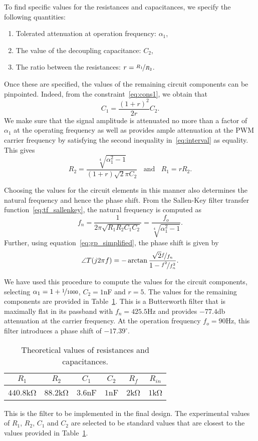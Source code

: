 To find specific values for the resistances and capacitances, we specify the
following quantities:
%
\begin{enumerate}
    \item Tolerated attenuation at operation frequency: $\alpha_1$,
    \item The value of the decoupling capacitance: $C_2$,
    \item The ratio between the resistances: $r = \nicefrac{R_1}{R_2}$.
\end{enumerate}
%
Once these are specified, the values of the remaining
circuit components can be pinpointed. Indeed, from the
constraint~\eqref{eq:cons1}, we obtain that \[C_1 = \frac{(1+r)^2}{2r}C_2. \] 
%
We make sure that the signal amplitude is attenuated no more than
a factor of $\alpha_1$ at the operating frequency as well as provides ample
attenuation at the PWM carrier frequency by satisfying the second inequality
in~\eqref{eq:interval} as equality. This gives \[ R_2 =
\frac{\sqrt[4]{\alpha_1^2-1}}{(1+r)\sqrt{2}\pi C_2} \;\; \text{ and } \;\; R_1 =
rR_2.\]

\begin{rem}
    Choosing the values for the circuit elements in this manner also determines
    the natural frequency and hence the phase shift. From the Sallen-Key filter
    transfer function~\ref{eq:tf_sallenkey}, the natural frequency is computed
    as \[f_n = \frac{1}{2\pi \sqrt{R_1R_2C_1C_2}} =
    \frac{f_o}{\sqrt[4]{\alpha_1^2 -1}}. \]
    Further, using equation~\eqref{eq:gp_simplified}, the phase shift is
    given by \[ \angle T(j2\pi f) =
    -\arctan{\frac{\sqrt{2}\nicefrac{f}{f_n}}{1-\nicefrac{f^2}{f_n^2}}}. \]
\end{rem}

We have used this procedure to compute the values for the circuit components,
selecting $\alpha_1 = 1+\nicefrac{1}{1000}$, $C_2 = 1$\unit{\nano\farad} and $r
= 5$. The values for the remaining components are provided in
Table~\ref{tab:theoretical_values}. This is a Butterworth filter that is
maximally flat in its passband with $f_n = 425.5$\unit{\hertz} and provides
$-77.4$\unit{\decibel} attenuation at the carrier frequency. At the operation
frequency $f_o = 90$\unit{\hertz}, this filter introduces a phase shift of
$-17.39^\circ$.

{\renewcommand{\arraystretch}{1.5}
\begin{table}[t]
    \centering
    \caption{Theoretical values of resistances and capacitances.}
    \begin{tabular}{*6c}
        \toprule
        $R_1$ & $R_2$ & $C_1$ & $C_2$ & $R_f$ & $R_{in}$ \\    
        \hline
        \midrule
        $440.8$\unit{\kilo\ohm} & $88.2$\unit{\kilo\ohm} &
        $3.6$\unit{\nano\farad} & $1$\unit{\nano\farad} &
        $2$\unit{\kilo\ohm} & $1$\unit{\kilo\ohm} \\
        \bottomrule
    \end{tabular}
    \label{tab:theoretical_values}
    \vspace{-1em}
\end{table}
}

\begin{rem}
    This is the filter to be implemented in the final design. The experimental
    values of $R_{1}$, $R_2$, $C_{1}$ and $C_2$ are selected to be standard
    values that are closest to the values provided in
    Table~\ref{tab:theoretical_values}.
\end{rem}
